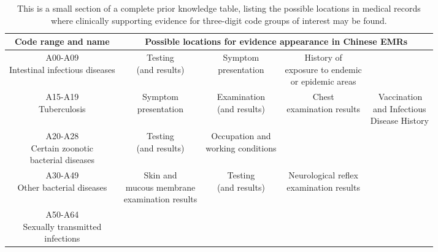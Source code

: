   
 \begin{table*}[h]
    \centering
    \caption{This is a small section of a complete prior knowledge table, listing the possible locations in medical records where clinically supporting evidence for three-digit code groups of interest may be found.}
     \renewcommand{\arraystretch}{1.2} %
    \begin{tabular}{ccccc}
    \toprule[1.2pt]
    Code range and name\;   & \multicolumn{4}{c}{Possible locations for evidence appearance in Chinese EMRs}\\
    \hline
    \makecell[c]{A00-A09\\Intestinal infectious diseases\;}  & \makecell[c]{ Testing \\(and results)} & \makecell[c]{Symptom \\presentation} &\makecell[c]{History of \\exposure to endemic \\or epidemic areas}&\\
    \hline
    \makecell[c]{A15-A19\\Tuberculosis}  & \makecell[c]{Symptom \\presentation} & \makecell[c]{Examination\\ (and results)} & \makecell[c]{ Chest \\ examination results}& \,\makecell[c]{Vaccination  \\ and Infectious \\Disease History}     \\
    \hline
    \makecell[c]{A20-A28\\Certain zoonotic\\bacterial diseases}   & \makecell[c]{Testing \\(and results) }& \makecell[c]{Occupation and \\ working conditions}   && \\
    \hline
    \makecell[c]{A30-A49\\Other bacterial diseases}  &  \makecell[c]{Skin and \\mucous membrane \\examination results} & \makecell[c]{Testing \\(and results)} & \makecell[c]{Neurological reflex\\examination results}  & \\
    \hline
    \makecell[c]{ A50-A64\\Sexually transmitted\\infections } 

\end{tabular}
\end{table*}
